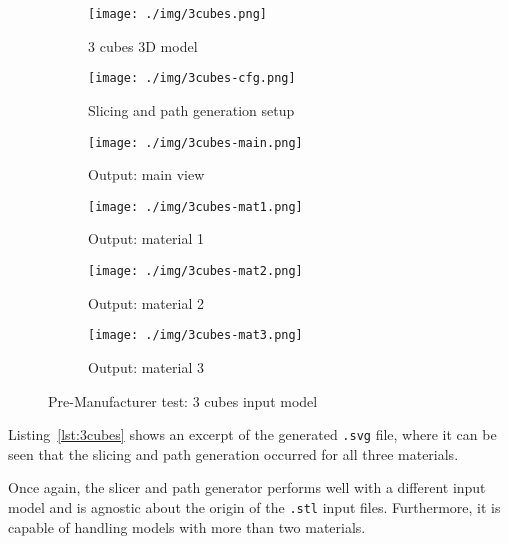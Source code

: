 \begin{figure}[htbp!]
  \centering
  \begin{subfigure}[t]{0.48\textwidth}
  \centering
  \texttt{[image: ./img/3cubes.png]}
  \caption{3 cubes 3D model}%
  \label{fig:3cubes-model}
  \end{subfigure}
%
  \begin{subfigure}[t]{0.48\textwidth}
  \centering
  \texttt{[image: ./img/3cubes-cfg.png]}
  \caption{Slicing and path generation setup}%
  \label{fig:3cubes-cfg}
\end{subfigure}
%
  \begin{subfigure}[t]{0.48\textwidth}
  \centering
  \texttt{[image: ./img/3cubes-main.png]}
  \caption{Output: main view}%
  \label{fig:3cubes-main}
\end{subfigure}
%
  \begin{subfigure}[t]{0.48\textwidth}
  \centering
  \texttt{[image: ./img/3cubes-mat1.png]}
  \caption{Output: material 1}%
  \label{fig:3cubes-mat1}
\end{subfigure}
%
  \begin{subfigure}[t]{0.48\textwidth}
  \centering
  \texttt{[image: ./img/3cubes-mat2.png]}
  \caption{Output: material 2}%
  \label{fig:3cubes-mat2}
\end{subfigure}
%
  \begin{subfigure}[t]{0.48\textwidth}
  \centering
  \texttt{[image: ./img/3cubes-mat3.png]}
  \caption{Output: material 3}%
  \label{fig:3cubes-mat3}
\end{subfigure}
%
  \caption{Pre-Manufacturer test: 3 cubes input model}%
  \label{fig:3cubes-test}
\end{figure}

Listing~\ref{lst:3cubes} shows an excerpt of the generated \texttt{.svg} file, where it can be seen that the slicing and path
generation occurred for all three materials.

Once again, the slicer and path generator performs well with a different
input model and is agnostic about the origin of the \texttt{.stl} input
files. Furthermore, it is capable of handling models with more than two
materials.

